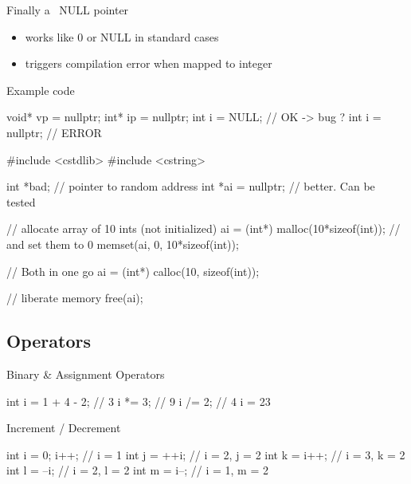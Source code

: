 \begin{frame}[fragile]
  \begin{block}{Finally a \cpp~NULL pointer}
    \begin{itemize}
    \item works like 0 or NULL in standard cases
    \item triggers compilation error when mapped to integer
    \end{itemize}
  \end{block}
  \pause
  \begin{exampleblock}{Example code}
    \begin{cppcode*}{}
      void* vp = nullptr;
      int* ip = nullptr;
      int i = NULL;      // OK -> bug ?
      int i = nullptr;   // ERROR
    \end{cppcode*}
  \end{exampleblock}
\end{frame}

\begin{frame}[fragile]
  \begin{cppcode}
    #include <cstdlib>
    #include <cstring>

    int *bad;          // pointer to random address
    int *ai = nullptr; // better. Can be tested

    // allocate array of 10 ints (not initialized)
    ai = (int*) malloc(10*sizeof(int));
    // and set them to 0
    memset(ai, 0, 10*sizeof(int));

    // Both in one go
    ai = (int*) calloc(10, sizeof(int));
    
    // liberate memory
    free(ai);
  \end{cppcode}
\end{frame}

\subsection[Op]{Operators}

\begin{frame}[fragile]
  \begin{block}{Binary \& Assignment Operators}
    \begin{cppcode*}{}
      int i = 1 + 4 - 2;  // 3
      i *= 3;             // 9
      i /= 2;             // 4
      i = 23 %
    \end{cppcode*}
  \end{block}
  \pause
  \begin{block}{Increment / Decrement }
    \begin{cppcode*}{}
      int i = 0; i++; // i = 1
      int j = ++i;    // i = 2, j = 2
      int k = i++;    // i = 3, k = 2
      int l = --i;    // i = 2, l = 2
      int m = i--;    // i = 1, m = 2
    \end{cppcode*}
  \end{block}
\end{frame}

